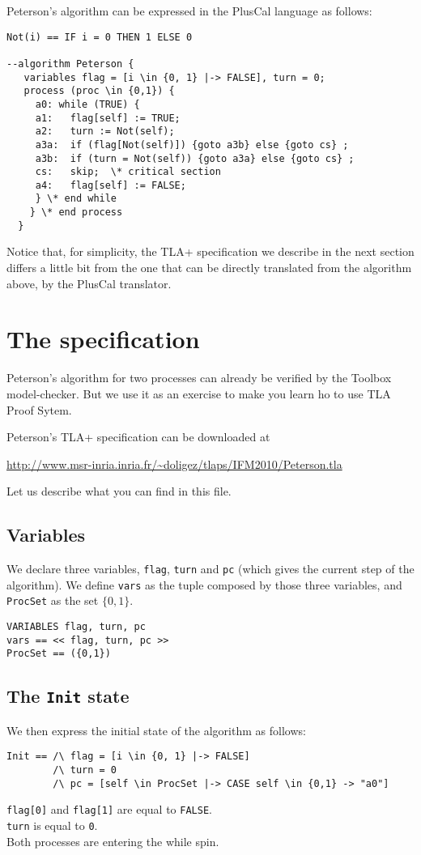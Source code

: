 \documentclass{enonce}
\begin{document}
Peterson's algorithm can be expressed in the PlusCal language as follows:
\smallskip

\begin{verbatim}
Not(i) == IF i = 0 THEN 1 ELSE 0

--algorithm Peterson {
   variables flag = [i \in {0, 1} |-> FALSE], turn = 0;
   process (proc \in {0,1}) {
     a0: while (TRUE) {
     a1:   flag[self] := TRUE;
     a2:   turn := Not(self);
     a3a:  if (flag[Not(self)]) {goto a3b} else {goto cs} ;
     a3b:  if (turn = Not(self)) {goto a3a} else {goto cs} ;
     cs:   skip;  \* critical section
     a4:   flag[self] := FALSE;
     } \* end while
    } \* end process
  }
\end{verbatim}

\noindent Notice that, for simplicity, the TLA+ specification we describe in the next section differs a little bit from the one that can be directly translated from the algorithm above, by the PlusCal translator.

\section{The specification}
Peterson's algorithm for two processes can already be verified by the Toolbox model-checker. But we use it as an exercise to make you learn ho to use TLA Proof Sytem.

\medskip

\noindent Peterson's TLA+ specification can be downloaded at 
\begin{center}
\url{http://www.msr-inria.inria.fr/~doligez/tlaps/IFM2010/Peterson.tla}
\end{center}
Let us describe what you can find in this file.

\subsection{Variables}
We declare three variables, {\tt flag}, {\tt turn} and {\tt pc} (which gives the current step of the algorithm).
We define {\tt vars} as the tuple composed by those three variables, and {\tt ProcSet} as the set $\{0,1\}$.
\begin{verbatim}
VARIABLES flag, turn, pc
vars == << flag, turn, pc >>
ProcSet == ({0,1})
\end{verbatim}

\subsection{The {\tt Init} state}
We then express the initial state of the algorithm as follows:
\begin{verbatim}
Init == /\ flag = [i \in {0, 1} |-> FALSE]
        /\ turn = 0
        /\ pc = [self \in ProcSet |-> CASE self \in {0,1} -> "a0"]
\end{verbatim}
{\tt flag[0]} and {\tt flag[1]} are equal to {\tt FALSE}.
\\ {\tt turn} is equal to {\tt 0}.
\\ Both processes are entering the while spin.
\end{document}
